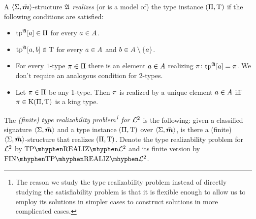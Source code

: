 \begin{definition}
A $\left\langle \mathrm{\Sigma},\bar{\bm{m}} \right\rangle$-structure $\mathfrak{A}$ \emph{realizes} (or is a model of) the
type instance $(\Pi,\mathrm{T})$ if the following conditions are satisfied:
\begin{itemize}
  \item[\condrealizI]\label{cond:realizI}
  $\operatorname{tp}^{\mathfrak{A}}[a] \in \Pi$ for every $a\in A$.
  \item[\condrealizII]\label{cond:realizII}
  $\operatorname{tp}^{\mathfrak{A}}[a,b] \in \mathrm{T}$ for every $a\in A$
  and $b \in A\setminus\left\{a\right\}$.
  \item[\condrealizp]\label{cond:realizp}
  For every  $1$-type $\pi \in \Pi$ there is
  an element $a \in A$ realizing $\pi$: $\operatorname{tp}^{\mathfrak{A}}[a] = \pi$.
  We don't require an analogous condition for $2$-types.
  \item[\condrealizk]\label{cond:realizk}
  Let $\pi \in \Pi$ be any $1$-type. Then $\pi$ is realized by
  a unique element $a \in A$ iff $\pi \in \mathrm{K}(\Pi,\mathrm{T})$ is a king
  type.
\end{itemize}
\end{definition}

\begin{definition}
The \emph{(finite) type realizability problem\footnote{The reason we study the
type realizability problem instead of directly studying the satisfiability
problem is that it is flexible enough to allow us to employ its solutions in simpler cases to construct solutions in more complicated cases.}
for $\mathcal{L}^{2}$} is the following:
given a classified signature $\left\langle \mathrm{\Sigma},\bar{\bm{m}} \right\rangle$ and a type instance
$(\Pi,\mathrm{T})$ over $\left\langle \mathrm{\Sigma},\bar{\bm{m}} \right\rangle$, is there a (finite)
$\left\langle \mathrm{\Sigma},\bar{\bm{m}} \right\rangle$-structure that realizes $(\Pi,\mathrm{T})$.
Denote the type realizability problem for $\mathcal{L}^{2}$ by
$\Real{\vFo2}$ and its finite version by $\FinReal{\vFo2}$.
\end{definition}

